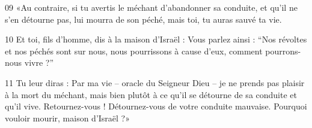 
09 «Au contraire, si tu avertis le méchant d’abandonner sa conduite, et qu’il ne s’en détourne pas, lui mourra de son péché, mais toi, tu auras sauvé ta vie.

10 Et toi, fils d’homme, dis à la maison d’Israël : Vous parlez ainsi : “Nos révoltes et nos péchés sont sur nous, nous pourrissons à cause d’eux, comment pourrons-nous vivre ?”

11 Tu leur diras : Par ma vie – oracle du Seigneur Dieu – je ne prends pas plaisir à la mort du méchant, mais bien plutôt à ce qu’il se détourne de sa conduite et qu’il vive. Retournez-vous ! Détournez-vous de votre conduite mauvaise. Pourquoi vouloir mourir, maison d’Israël ?»
